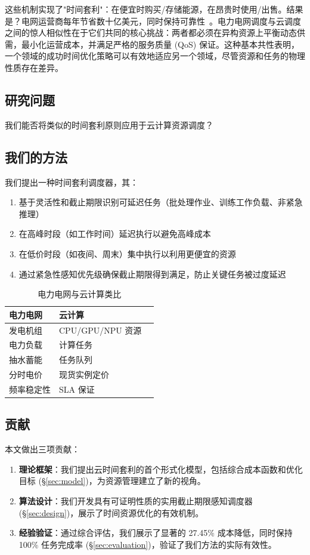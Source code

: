 \documentclass[10pt,a4paper]{article}
\begin{document}
这些机制实现了"时间套利"：在便宜时购买/存储能源，在昂贵时使用/出售。结果是？电网运营商每年节省数十亿美元，同时保持可靠性~\cite{denholm2016value}。电力电网调度与云调度之间的惊人相似性在于它们共同的核心挑战：两者都必须在异构资源上平衡动态供需，最小化运营成本，并满足严格的服务质量 (QoS) 保证。这种基本共性表明，一个领域的成功时间优化策略可以有效地适应另一个领域，尽管资源和任务的物理性质存在差异。

\subsection{研究问题}

我们能否将类似的时间套利原则应用于云计算资源调度？

\subsection{我们的方法}

我们提出一种时间套利调度器，其：
\begin{enumerate}
    \item 基于灵活性和截止期限识别可延迟任务（批处理作业、训练工作负载、非紧急推理）
    \item 在高峰时段（如工作时间）延迟执行以避免高峰成本
    \item 在低价时段（如夜间、周末）集中执行以利用更便宜的资源
    \item 通过紧急性感知优先级确保截止期限得到满足，防止关键任务被过度延迟
\end{enumerate}

\begin{table}[h]
\centering
\caption{电力电网与云计算类比}
\label{tab:analogy}
\begin{tabular}{@{}llc@{}}
\toprule
\textbf{电力电网} & \textbf{云计算} \\
\midrule
发电机组 & CPU/GPU/NPU 资源 \\
电力负载 & 计算任务 \\
抽水蓄能 & 任务队列 \\
分时电价 & 现货实例定价 \\
频率稳定性 & SLA 保证 \\
\bottomrule
\end{tabular}
\end{table}

\subsection{贡献}

本文做出三项贡献：
\begin{enumerate}
    \item \textbf{理论框架}：我们提出云时间套利的首个形式化模型，包括综合成本函数和优化目标 (\S\ref{sec:model})，为资源管理建立了新的视角。
    \item \textbf{算法设计}：我们开发具有可证明性质的实用截止期限感知调度器 (\S\ref{sec:design})，展示了时间资源优化的有效机制。
    \item \textbf{经验验证}：通过综合评估，我们展示了显著的 27.45\% 成本降低，同时保持 100\% 任务完成率 (\S\ref{sec:evaluation})，验证了我们方法的实际有效性。
\end{enumerate}
\end{document}
